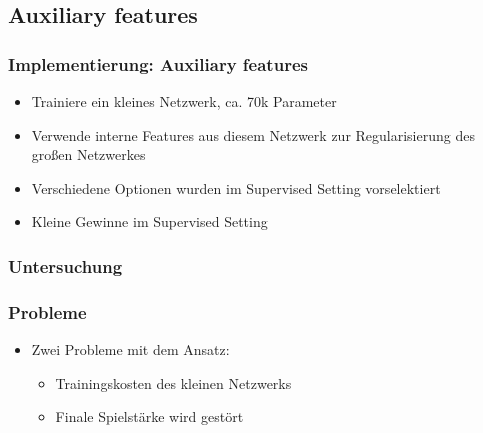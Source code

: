 \subsection{Auxiliary features}



\begin{frame}
 \frametitle{Implementierung: Auxiliary features}
  


\begin{itemize}
  \item \pause Trainiere ein kleines Netzwerk, ca. 70k Parameter
  \item \pause Verwende interne Features aus diesem Netzwerk zur Regularisierung des großen Netzwerkes
  \item \pause Verschiedene Optionen wurden im Supervised Setting vorselektiert
  \item \pause Kleine Gewinne im Supervised Setting
\end{itemize}

  
\end{frame}
\begin{frame}
 \frametitle{Untersuchung}
  


  
\end{frame}
\begin{frame}
 \frametitle{Probleme}
  


\begin{itemize}
  \item \pause Zwei Probleme mit dem Ansatz:
\begin{itemize}
  \item \pause Trainingskosten des kleinen Netzwerks
  \item \pause Finale Spielstärke wird gestört
\end{itemize}
\end{itemize}

  
\end{frame}
